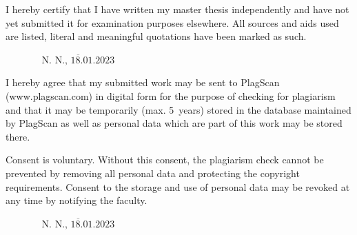 \documentclass[12pt,twoside,a4paper,parskip]{scrbook} %
\def\BaAuthor{Mahesh Saravanan \\ K54723}
\def\SubmitDate{18.01.2023}
\def\ShowBaAuthor{\BaAuthor}
\def\ShowBaAuthor{N.~N.}
\begin{document}
I hereby certify that I have written my master thesis independently and have not yet submitted it for examination purposes elsewhere. All sources and aids used are listed, literal and meaningful quotations have been marked as such.

\vspace{20pt}
\begin{flushright}
$\overline{~~~~~~~~~~~~~~~~~\mbox{\ShowBaAuthor, \SubmitDate}~~~~~~~~~~~~~~~~~}$
\end{flushright}


I hereby agree that my submitted work may be sent to PlagScan (www.plagscan.com) in digital form for the purpose of checking for plagiarism and that it may be temporarily (max. 5~years) stored in the database maintained by PlagScan as well as personal data which are part of this work may be stored there.

\begin{small}
Consent is voluntary. Without this consent, the plagiarism check cannot be prevented by removing all personal data and protecting the copyright requirements. Consent to the storage and use of personal data may be revoked at any time by notifying the faculty.
\end{small}

\vspace{20pt}
\begin{flushright}
$\overline{~~~~~~~~~~~~~~~~~\mbox{\ShowBaAuthor, \SubmitDate}~~~~~~~~~~~~~~~~~}$
\end{flushright}
\end{document}
